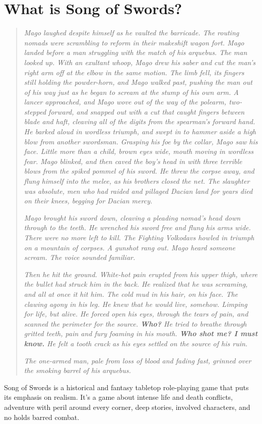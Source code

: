 \documentclass[oneside,11pt,english]{book}
\begin{document}
\section{What is Song of Swords?}
	\begin{quotation}
{\small \emph{Mago laughed despite himself as he vaulted the barricade. The routing nomads were scrambling to reform in their 
makeshift wagon fort. Mago landed before a man struggling with the match of his arquebus. The man looked up. 
With an exultant whoop, Mago drew his saber and cut the man’s right arm off at the elbow in the same motion. The 
limb fell, its fingers still holding the powder-horn, and Mago walked past, pushing the man out of his way just as he 
began to scream at the stump of his own arm. A lancer approached, and Mago wove out of the way of the polearm, 
two-stepped forward, and snapped out with a cut that caught fingers between blade and haft, cleaving all of the 
digits from the spearman’s forward hand. He barked aloud in wordless triumph, and swept in to hammer aside a 
high blow from another swordsman. Grasping his foe by the collar, Mago saw his face. Little more than a child, 
brown eyes wide, mouth moving in wordless fear. Mago blinked, and then caved the boy’s head in with three terrible 
blows from the spiked pommel of his sword. He threw the corpse away, and flung himself into the melee, as his 
brothers closed the net. The slaughter was absolute, men who had raided and pillaged Dacian land for years died 
on their knees, begging for Dacian mercy.}\par
\emph{Mago brought his sword down, cleaving a pleading nomad’s head down through to the teeth. He wrenched his 
sword free and flung his arms wide. There were no more left to kill. The Fighting Volkodavs howled in triumph on a 
mountain of corpses. A gunshot rang out. Mago heard someone scream. The voice sounded familiar.}\par
\emph{Then he hit the ground. White-hot pain erupted from his upper thigh, where the bullet had struck him in the back. He 
realized that he was screaming, and all at once it hit him. The cold mud in his hair, on his face. The clawing agony 
in his leg. He knew that he would live, somehow. Limping for life, but alive. He forced open his eyes, through the 
tears of pain, and scanned the perimeter for the source. \textbf{Who?} He tried to breathe through gritted teeth, pain and 
fury foaming in his mouth. \textbf{Who shot me? I must know.} He felt a tooth crack as his eyes settled on the source of his 
ruin.}\par
\emph{The one-armed man, pale from loss of blood and fading fast, grinned over the smoking barrel of his arquebus.}}\par
	\end{quotation}
Song of Swords is a historical and fantasy tabletop role-playing game that puts its emphasis on realism. 
It's a game about intense life and death conflicts, adventure with peril around every corner, deep stories, 
involved characters, and no holds barred combat. 
\end{document}
